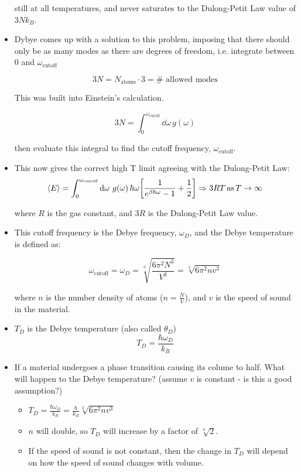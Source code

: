 \begin{itemize}
    still at all temperatures, and never saturates to the Dulong-Petit Law value of $3Nk_B$.
    
    \item Dybye comes up with a solution to this problem, imposing that there should only be as many modes as there are degrees of freedom, i.e. integrate between $0$ and $\omega_{\text{cutoff}}$
    
    \[ 3N = N_{\text{atoms}} \cdot 3 = \# \text{ allowed modes} \]
    
    This was built into Einstein's calculation.

    \[ 3 N = \int_{0}^{\omega_{\text{cutoff}}} \dd{\omega} \, g(\omega) \]

    then evaluate this integral to find the cutoff frequency, $\omega_{\text{cutoff}}$.

    \item This now gives the correct high T limit agreeing with the Dulong-Petit Law:
    \[ \avg{E} = \int_{0}^{\omega_{\text{cutoff}}} \dd{\omega} \, g(\omega) \, \hbar \omega \brackets*{\frac{1}{e^{\beta \hbar \omega} - 1} + \frac{1}{2}} \Rightarrow 3 R T \, \text{as} \, T \to \infty \]

    where $R$ is the gas constant, and $3 R$ is the Dulong-Petit Law value.

    \item This cutoff frequency is the Debye frequency, $\omega_D$, and the Debye temperature is defined as:

    \[ \omega_{\text{cutoff}} = \omega_D = \sqrt[3]{\frac{6 \pi^2 N^3}{V^3}}  = \sqrt[3]{6 \pi^2 n v^3}\]

    where $n$ is the number density of atoms ($n = \frac{N}{V}$), and $v$ is the speed of sound in the material.

    \item $T_D$ is the Debye temperature (also called $\theta_D$)
    \[ T_D = \frac{\hbar \omega_D}{k_B} \]
    
    \item If a material undergoes a phase transition causing its colume to half. What will happen to the Debye temperature? (assume $v$ is constant - is this a good assumption?)
    
    \begin{itemize}
        \item $T_D = \frac{\hbar \omega_D}{k_B} = \frac{\hbar}{k_B} \sqrt[3]{6 \pi^2 n v^3}$
        \item $n$ will double, so $T_D$ will increase by a factor of $\sqrt[3]{2}$.
        \item If the speed of sound is not constant, then the change in $T_D$ will depend on how the speed of sound changes with volume.
    \end{itemize}


\end{itemize}
